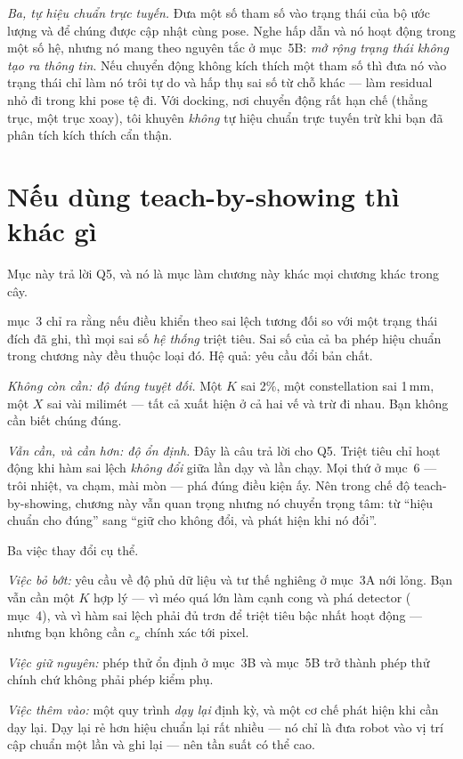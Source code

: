 \documentclass[../../marker.tex]{subfiles}
\begin{document}
\emph{Ba, tự hiệu chuẩn trực tuyến.} Đưa một số tham số vào trạng thái của bộ ước lượng và để chúng được cập nhật cùng pose. Nghe hấp dẫn và nó hoạt động trong một số hệ, nhưng nó mang theo nguyên tắc ở mục~5B: \emph{mở rộng trạng thái không tạo ra thông tin}. Nếu chuyển động không kích thích một tham số thì đưa nó vào trạng thái chỉ làm nó trôi tự do và hấp thụ sai số từ chỗ khác --- làm residual nhỏ đi trong khi pose tệ đi. Với docking, nơi chuyển động rất hạn chế (thẳng trục, một trục xoay), tôi khuyên \emph{không} tự hiệu chuẩn trực tuyến trừ khi bạn đã phân tích kích thích cẩn thận.

\section{Nếu dùng teach-by-showing thì khác gì}

Mục này trả lời Q5, và nó là mục làm chương này khác mọi chương khác trong cây.

 mục~3 chỉ ra rằng nếu điều khiển theo sai lệch tương đối so với một trạng thái đích đã ghi, thì mọi sai số \emph{hệ thống} triệt tiêu. Sai số của cả ba phép hiệu chuẩn trong chương này đều thuộc loại đó. Hệ quả: yêu cầu đổi bản chất.

\emph{Không còn cần: độ đúng tuyệt đối.} Một \(K\) sai 2\%, một constellation sai 1\,mm, một \(X\) sai vài milimét --- tất cả xuất hiện ở cả hai vế và trừ đi nhau. Bạn không cần biết chúng đúng.

\emph{Vẫn cần, và cần hơn: độ ổn định.} Đây là câu trả lời cho Q5. Triệt tiêu chỉ hoạt động khi hàm sai lệch \emph{không đổi} giữa lần dạy và lần chạy. Mọi thứ ở mục~6 --- trôi nhiệt, va chạm, mài mòn --- phá đúng điều kiện ấy. Nên trong chế độ teach-by-showing, chương này vẫn quan trọng nhưng nó chuyển trọng tâm: từ ``hiệu chuẩn cho đúng'' sang ``giữ cho không đổi, và phát hiện khi nó đổi''.

Ba việc thay đổi cụ thể.

\emph{Việc bỏ bớt:} yêu cầu về độ phủ dữ liệu và tư thế nghiêng ở mục~3A nới lỏng. Bạn vẫn cần một \(K\) hợp lý --- vì méo quá lớn làm cạnh cong và phá detector ( mục~4), và vì hàm sai lệch phải đủ trơn để triệt tiêu bậc nhất hoạt động --- nhưng bạn không cần \(c_x\) chính xác tới pixel.

\emph{Việc giữ nguyên:} phép thử ổn định ở mục~3B và mục~5B trở thành phép thử chính chứ không phải phép kiểm phụ.

\emph{Việc thêm vào:} một quy trình \emph{dạy lại} định kỳ, và một cơ chế phát hiện khi cần dạy lại. Dạy lại rẻ hơn hiệu chuẩn lại rất nhiều --- nó chỉ là đưa robot vào vị trí cập chuẩn một lần và ghi lại --- nên tần suất có thể cao.
\end{document}
